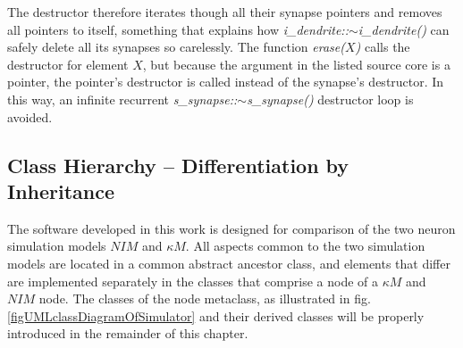 		The destructor therefore iterates though all their synapse pointers and removes all pointers to itself, something that explains how \emph{i\_dendrite::$\sim$i\_dendrite()} can safely delete all its synapses so carelessly. %
		The function \emph{erase($X$)} calls the destructor for element $X$, but because the argument in the listed source core is a pointer, 
			the pointer's destructor is called instead of the synapse's destructor.
		In this way, an infinite recurrent \emph{s\_synapse::$\sim$s\_synapse()} destructor loop is avoided. 



	\subsection{Class Hierarchy -- Differentiation by Inheritance}


		The software developed in this work is designed for comparison of the two neuron simulation models $NIM$ and $\kappa M$.
		All aspects common to the two simulation models are located in a common abstract ancestor class, and elements that differ are implemented separately in the classes that comprise a node of a $\kappa M$ and $NIM$ node.
		The classes of the node metaclass, as illustrated in fig. \ref{figUMLclassDiagramOfSimulator} and their derived classes will be properly introduced in the remainder of this chapter.

